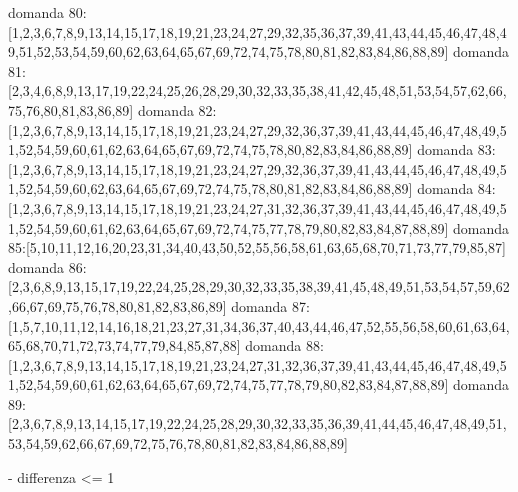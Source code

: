 domanda 80:[1,2,3,6,7,8,9,13,14,15,17,18,19,21,23,24,27,29,32,35,36,37,39,41,43,44,45,46,47,48,49,51,52,53,54,59,60,62,63,64,65,67,69,72,74,75,78,80,81,82,83,84,86,88,89]
domanda 81:[2,3,4,6,8,9,13,17,19,22,24,25,26,28,29,30,32,33,35,38,41,42,45,48,51,53,54,57,62,66,75,76,80,81,83,86,89]
domanda 82:[1,2,3,6,7,8,9,13,14,15,17,18,19,21,23,24,27,29,32,36,37,39,41,43,44,45,46,47,48,49,51,52,54,59,60,61,62,63,64,65,67,69,72,74,75,78,80,82,83,84,86,88,89]
domanda 83:[1,2,3,6,7,8,9,13,14,15,17,18,19,21,23,24,27,29,32,36,37,39,41,43,44,45,46,47,48,49,51,52,54,59,60,62,63,64,65,67,69,72,74,75,78,80,81,82,83,84,86,88,89]
domanda 84:[1,2,3,6,7,8,9,13,14,15,17,18,19,21,23,24,27,31,32,36,37,39,41,43,44,45,46,47,48,49,51,52,54,59,60,61,62,63,64,65,67,69,72,74,75,77,78,79,80,82,83,84,87,88,89]
domanda 85:[5,10,11,12,16,20,23,31,34,40,43,50,52,55,56,58,61,63,65,68,70,71,73,77,79,85,87]
domanda 86:[2,3,6,8,9,13,15,17,19,22,24,25,28,29,30,32,33,35,38,39,41,45,48,49,51,53,54,57,59,62,66,67,69,75,76,78,80,81,82,83,86,89]
domanda 87:[1,5,7,10,11,12,14,16,18,21,23,27,31,34,36,37,40,43,44,46,47,52,55,56,58,60,61,63,64,65,68,70,71,72,73,74,77,79,84,85,87,88]
domanda 88:[1,2,3,6,7,8,9,13,14,15,17,18,19,21,23,24,27,31,32,36,37,39,41,43,44,45,46,47,48,49,51,52,54,59,60,61,62,63,64,65,67,69,72,74,75,77,78,79,80,82,83,84,87,88,89]
domanda 89:[2,3,6,7,8,9,13,14,15,17,19,22,24,25,28,29,30,32,33,35,36,39,41,44,45,46,47,48,49,51,53,54,59,62,66,67,69,72,75,76,78,80,81,82,83,84,86,88,89]


- differenza <= 1

